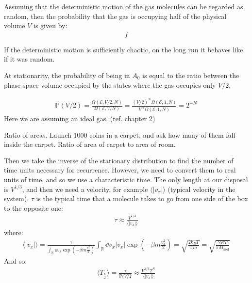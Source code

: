 \documentclass[../template.tex]{subfiles}
\begin{document}
\medskip

Assuming that the deterministic motion of the gas molecules can be regarded as random, then the probability that the gas is occupying half of the physical volume $V$ is given by:
\begin{align*}
    f
\end{align*}


If the deterministic motion is sufficiently chaotic, on the long run it behaves like if it was random. 

At stationarity, the probability of being in $A_0$ is equal to the ratio between the phase-space volume occupied by the states where the gas occupies only $V/2$. 

\begin{align*}
    \mathbb{P}(V/2) = \frac{\Omega(\mathcal{E}, V/2, N)}{\Omega(\mathcal{E}, V, N)} = \frac{(V/2)^N \Omega(\mathcal{E},1, N)}{V^N \Omega (\mathcal{E},1,N)} = 2^{-N}
\end{align*}
Here we are assuming an ideal gas. (ref. chapter 2)

Ratio of areas. Launch 1000 coins in a carpet, and ask how many of them fall inside the carpet. Ratio of area of carpet to area of room. 

Then we take the inverse of the stationary distribution to find the number of time units necessary for recurrence. However, we need to convert them to real units of time, and so we use a characteristic time. The only length at our disposal is $V^{1/3}$, and then we need a velocity, for example $\langle |v_x| \rangle$ (typical velocity in the system). 
$\tau$ is the typical time that a molecule takes to go from one side of the box to the opposite one:
\begin{align*}
    \tau \approx \frac{V^{1/3}}{\langle |v_x| \rangle} 
\end{align*}
where:
\begin{align*}
    \langle |v_x| \rangle = \frac{1}{{\int_{\mathbb{R}} \dd{v_x} \exp\left(-\beta m \frac{v_x^2}{2} \right)}}  \int_{\mathbb{R}} \dd{v_x} |v_x| {\exp(-\beta m \frac{v_x^2}{2} )} = \sqrt{\frac{2 k_B T}{\pi m}} = \sqrt{\frac{2 R T}{\pi M_{\mathrm{mol}}} }
\end{align*}
And so:
\begin{align*}
    \langle T_{\frac{V}{2}} \rangle = \frac{\tau}{\mathbb{P}(V/2} \approx \frac{V^{1/3} 2^N}{\langle |v_x| \rangle} 
\end{align*}%
\end{document}

